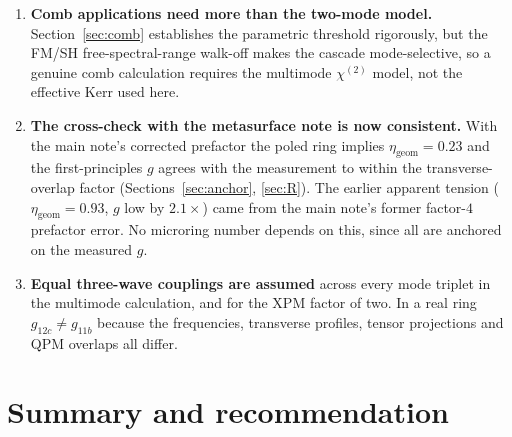 \documentclass[11pt,a4paper]{article}
\newcommand{\chitwo}{\chi^{(2)}}
\begin{document}
\begin{enumerate}[leftmargin=1.8em,itemsep=3pt]
  just the readout.  Cladding removal~\cite{Xu2021}, elevated
  temperature and MgO doping are the known mitigations; none is free.
\item \textbf{Comb applications need more than the two-mode model.}
  Section~\ref{sec:comb} establishes the parametric threshold
  rigorously, but the FM/SH free-spectral-range walk-off makes the
  cascade mode-selective, so a genuine comb calculation requires the
  multimode $\chitwo$ model, not the effective Kerr used here.
\item \textbf{The cross-check with the metasurface note is now
  consistent.}  With the main note's corrected prefactor the poled ring
  implies $\eta_{\text{geom}}=0.23$ and the first-principles $g$ agrees
  with the measurement to within the transverse-overlap factor
  (Sections~\ref{sec:anchor}, \ref{sec:R}).  The earlier apparent tension
  ($\eta_{\text{geom}}=0.93$, $g$ low by $2.1\times$) came from the main
  note's former factor-$4$ prefactor error.  No microring number depends
  on this, since all are anchored on the measured $g$.
\item \textbf{Equal three-wave couplings are assumed} across every mode
  triplet in the multimode calculation, and for the XPM factor of two.
  In a real ring $g_{12c}\neq g_{11b}$ because the frequencies, transverse
  profiles, tensor projections and QPM overlaps all differ.
\end{enumerate}

\section{Summary and recommendation}\label{sec:summary}
\end{document}
